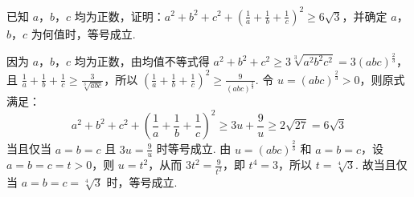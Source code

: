 \begin{problem}
已知 \(a\)，\(b\)，\(c\) 均为正数，证明：\(a^2 + b^2 + c^2 + \left(\frac{1}{a} + \frac{1}{b} + \frac{1}{c}\right)^2 \geqslant 6\sqrt{3}\)，并确定 \(a\)，\(b\)，\(c\) 为何值时，等号成立.
\end{problem}

\begin{solution}
因为 \(a\)，\(b\)，\(c\) 均为正数，由均值不等式得 \(a^2+b^2+c^2\geqslant3\sqrt[3]{a^2b^2c^2}=3(abc)^{\frac{2}{3}}\)，且 \(\frac{1}{a}+\frac{1}{b}+\frac{1}{c}\geqslant\frac{3}{\sqrt[3]{abc}}\)，所以 \(\left(\frac{1}{a}+\frac{1}{b}+\frac{1}{c}\right)^2\geqslant\frac{9}{(abc)^{\frac{2}{3}}}\). 令 \(u=(abc)^{\frac{2}{3}}>0\)，则原式满足：
\[
a^2+b^2+c^2+\left(\frac{1}{a}+\frac{1}{b}+\frac{1}{c}\right)^2\geqslant3u+\frac{9}{u}\geqslant2\sqrt{27}=6\sqrt{3}
\]
当且仅当 \(a=b=c\) 且 \(3u=\frac{9}{u}\) 时等号成立. 由 \(u=(abc)^{\frac{2}{3}}\) 和 \(a=b=c\)，设 \(a=b=c=t>0\)，则 \(u=t^2\)，从而 \(3t^2=\frac{9}{t^2}\)，即 \(t^4=3\)，所以 \(t=\sqrt[4]{3}\). 故当且仅当 \(a=b=c=\sqrt[4]{3}\) 时，等号成立.
\end{solution}
